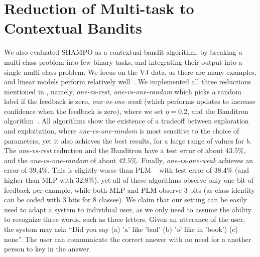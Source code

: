 \section{Reduction of Multi-task to Contextual Bandits}
We also evaluated SHAMPO as a contextual bandit algorithm, by breaking a multi-class problem into few 
binary tasks, and integrating their output into a single multi-class problem. 
We focus on the VJ data, as there are many examples, and linear models perform relatively 
well~\cite{lin2009lose}.  We implemented all three reductions
mentioned in , namely, {\em one-vs-rest}, {\em one-vs-one-random} which picks a 
random label if the feedback is zero, {\em one-vs-one-weak} (which performs updates to increase 
confidence when the feedback is zero), where we set $\eta=0.2$, and the 
Banditron algorithm~\cite{kakade2008efficient}.
All algorithms show the existence of a tradeoff between exploration and exploitation, 
where {\em one-vs-one-random} is most sensitive to the choice of parameters, yet it also achieves the best 
results, for a large range of values for $b$.
The  {\em one-vs-rest} reduction and the Banditron have a test error of about $43.5\%$, and the 
{\em one-vs-one-random} of about $42.5\%$.
Finally, {\em one-vs-one-weak} achieves an error of $39.4\%$.
 This is slightly worse than PLM
~\cite{lin2009lose} with test error of $38.4\%$ (and higher than MLP with $32.8\%$), 
yet all of these algorithms observe only one bit of feedback per example, while both MLP and PLM 
observe $3$ bits (as class identity can be coded with $3$ bits for $8$ classes). We claim that our setting 
can be easily used to adapt a system to individual user, as we only need to assume the ability to recognize 
three words, such as three letters. Given an utterance of the user, the system may ask: 
``Did you say (a) 'a' like 'bad' (b) 'o' like in 'book') (c) none''. The user can communicate the correct answer 
with no need for a another person to key in the answer.


